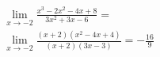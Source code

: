 \begin{ex}
\begin{align}
&\lim_{x\rightarrow -2} \frac{x^3-2x^2-4x+8}{3x^2+3x-6}=\nonumber\\
&\lim_{x\rightarrow -2} \frac{(x+2)(x^2-4x+4)}{(x+2)(3x-3)}=-\frac{16}{9}\nonumber
\end{align}
\end{ex}
